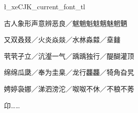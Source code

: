 \documentclass[fontset=ubuntu]{ctexart}
\begin{document}
\fontname\font\par
\begin{center}
  \ExplSyntaxOn
  \l_xeCJK_current_font_tl\par
  \ExplSyntaxOff
  \makeatletter\CJK@family\makeatother\par
  古人象形声意辨恶良／魃魈魁鬾魑魅魍魉   \par
  又双叒叕／火炎焱燚／水沝淼㵘／㙓𨰻     \par
  茕茕孑立／沆瀣一气／踽踽独行／醍醐灌顶 \par
  绵绵瓜瓞／奉为圭臬／龙行龘龘／犄角旮旯 \par
  娉婷袅娜／涕泗滂沱／呶呶不休／不稂不莠 \par
  卬……
\end{center}
\end{document}
